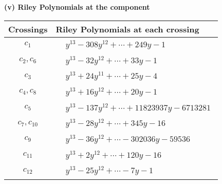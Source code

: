 \documentclass[1p]{elsarticle_modified}
\theoremstyle{definition}
\begin{document}
\newpage\renewcommand{\arraystretch}{1}
\flushleft \textbf{(v) Riley Polynomials at the component}\newline \\
\begin{tabular}{m{50pt}|m{274pt}}
Crossings & \hspace{64pt}Riley Polynomials at each crossing \\
\hline $$\begin{aligned}c_{1}\end{aligned}$$&$\begin{aligned}
&y^{13}-308 y^{12}+\cdots+249 y-1
\end{aligned}$\\
\hline $$\begin{aligned}c_{2},c_{6}\end{aligned}$$&$\begin{aligned}
&y^{13}-32 y^{12}+\cdots+33 y-1
\end{aligned}$\\
\hline $$\begin{aligned}c_{3}\end{aligned}$$&$\begin{aligned}
&y^{13}+24 y^{11}+\cdots+25 y-4
\end{aligned}$\\
\hline $$\begin{aligned}c_{4},c_{8}\end{aligned}$$&$\begin{aligned}
&y^{13}+16 y^{12}+\cdots+20 y-1
\end{aligned}$\\
\hline $$\begin{aligned}c_{5}\end{aligned}$$&$\begin{aligned}
&y^{13}-137 y^{12}+\cdots+11823937 y-6713281
\end{aligned}$\\
\hline $$\begin{aligned}c_{7},c_{10}\end{aligned}$$&$\begin{aligned}
&y^{13}-28 y^{12}+\cdots+345 y-16
\end{aligned}$\\
\hline $$\begin{aligned}c_{9}\end{aligned}$$&$\begin{aligned}
&y^{13}-36 y^{12}+\cdots-302036 y-59536
\end{aligned}$\\
\hline $$\begin{aligned}c_{11}\end{aligned}$$&$\begin{aligned}
&y^{13}+2 y^{12}+\cdots+120 y-16
\end{aligned}$\\
\hline $$\begin{aligned}c_{12}\end{aligned}$$&$\begin{aligned}
&y^{13}-25 y^{12}+\cdots-7 y-1
\end{aligned}$\\
\hline
\end{tabular}\\~\\
\end{document}
